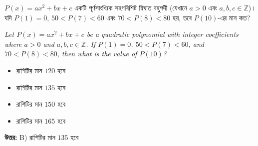 \documentclass[12pt, a4paper]{article}
\begin{document}
\vspace{1.5em}

\begin{tcolorbox}[questionbox={প্রশ্ন (Question) 32}]
    \noindent
    $P(x) = ax^2 + bx + c$ একটি পূর্ণসাংখ্যিক সহগবিশিষ্ট দ্বিঘাত বহুপদী (যেখানে $a > 0$ এবং $a, b, c \in \mathbb{Z}$)। যদি $P(1) = 0$, $50 < P(7) < 60$ এবং $70 < P(8) < 80$ হয়, তবে $P(10)$-এর মান কত?
    
    \vspace{0.8em}
    \begin{english}
    \noindent\textit{\color{darkgray}
    Let $P(x) = ax^2 + bx + c$ be a quadratic polynomial with integer coefficients where $a > 0$ and $a, b, c \in \mathbb{Z}$. If $P(1) = 0$, $50 < P(7) < 60$, and $70 < P(8) < 80$, then what is the value of $P(10)$?
    }
    \end{english}
\end{tcolorbox}

\begin{itemize}[label={}, leftmargin=1cm, itemsep=0.5em]
    \item[\textbf{A)}] রাশিটির মান $120$ হবে
    \item[\textbf{B)}] রাশিটির মান $135$ হবে
    \item[\textbf{C)}] রাশিটির মান $150$ হবে
    \item[\textbf{D)}] রাশিটির মান $165$ হবে
\end{itemize}

\vspace{0.5em}
\begin{tcolorbox}[answerbox]
    \textbf{\color{success} উত্তর:} B) রাশিটির মান $135$ হবে
\end{tcolorbox}
\vspace{1em}
\end{document}
